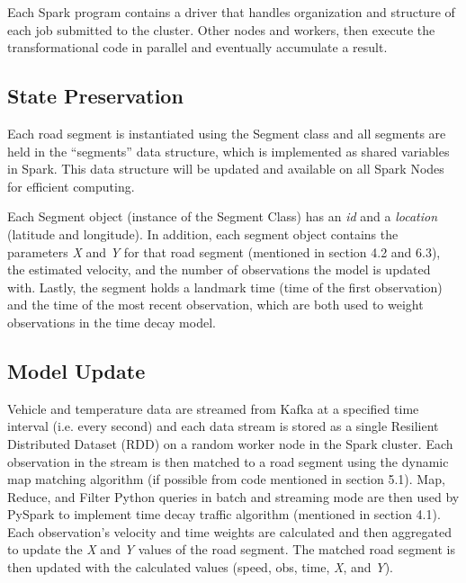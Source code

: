 \documentclass{vldb}
\begin{document}
Each Spark program contains a driver that handles organization and structure of each job submitted to the cluster. Other nodes and workers, then execute the transformational code in parallel and eventually accumulate a result. 

\subsection{State Preservation}
Each road segment is instantiated using the Segment class and all segments are held in the ``segments'' data structure, which is implemented as shared variables in Spark. This data structure will be updated and available on all Spark Nodes for efficient computing. 



Each Segment object (instance of the Segment Class) has an \textit{id} and a \textit{location} (latitude and longitude). In addition, each segment object contains the parameters \textit{X} and \textit{Y} for that road segment (mentioned in section 4.2 and 6.3), the estimated velocity, and the number of observations the model is updated with. Lastly, the segment holds a landmark time (time of the first observation) and the time of the most recent observation, which are both used to weight observations in the time decay model. 



\subsection{Model Update}

Vehicle and temperature data are streamed from Kafka at a specified time interval (i.e. every second) and each data stream is stored as a single Resilient Distributed Dataset (RDD) on a random worker node in the Spark cluster. Each observation in the stream is then matched to a road segment using the dynamic map matching algorithm (if possible from code mentioned in section 5.1). Map, Reduce, and Filter Python queries in batch and streaming mode are then used by PySpark to implement time decay traffic algorithm (mentioned in section 4.1). Each observation's velocity and time weights are calculated and then aggregated to update the \textit{X} and \textit{Y} values of the road segment. The matched road segment is then updated with the calculated values (speed, obs, time, \textit{X}, and \textit{Y}).
\end{document}
